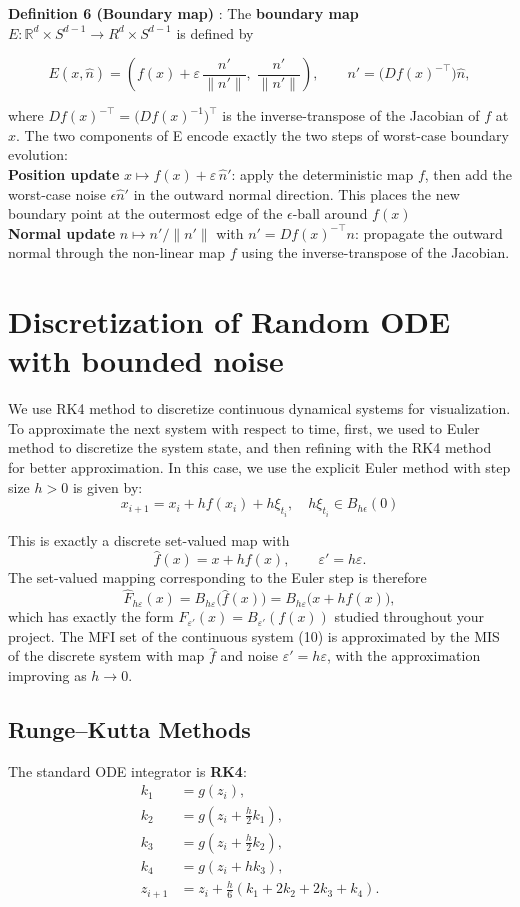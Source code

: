 \documentclass[11pt]{article}
\begin{document}
\textbf{Definition 6 (Boundary map)} \cite{tey2023}: The \textbf{boundary map} $E: \mathbb{R}^d \times S^{d-1} \to {R}^d \times S^{d-1}$ is defined by

\[
E(x,\hat{n})=\left(f(x)+\varepsilon\,\frac{n'}{\|n'\|},\;\frac{n'}{\|n'\|}\right),
\qquad
n'=\bigl(Df(x)^{-\top}\bigr)\hat{n}, \tag{6}
\]

where $Df(x)^{-\top} = \bigl(Df(x)^{-1}\bigr)^\top$ is the inverse-transpose of the Jacobian of \(f\) at \(x\).
The two components of E encode exactly the two steps of worst-case boundary evolution: \\
\textbf{Position update} \(x \mapsto f(x) + \varepsilon\,\hat{n}'\): apply the deterministic map $f$, then add the worst-case noise $\epsilon\hat{n}'$ in the outward normal direction. This places the new boundary point at the outermost edge of the $\epsilon$-ball around $f(x)$\\ 
\textbf{Normal update} \(n \mapsto n'/\|n'\|\) with \(n' = Df(x)^{-\top}n\): propagate the outward normal through the non-linear map $f$ using the inverse-transpose of the Jacobian.
\section{Discretization of Random ODE with bounded noise}
We use RK4 method to discretize continuous dynamical systems for visualization. To approximate the next system with respect to time, first, we used to Euler method to discretize the system state, and then refining with the RK4 method for better approximation. In this case, we use the explicit Euler method with step size $h > 0$ is given by:
\[
    x_{i+1} = x_i + hf(x_i) + h\xi_{t_{i}}, \quad h\xi_{t_{i}} \in B_{h\epsilon}(0)
\]


This is exactly a discrete set-valued map with
\[
\hat{f}(x)=x+h f(x), \qquad \varepsilon' = h\varepsilon. \tag{7}
\]
The set-valued mapping corresponding to the Euler step is therefore
\[
\hat{F}_{h\varepsilon}(x)=B_{h\varepsilon}\!\bigl(\hat{f}(x)\bigr) = B_{h\varepsilon}\!\bigl(x+h f(x)\bigr), \tag{8}
\]
which has exactly the form \(F_{\varepsilon'}(x)=B_{\varepsilon'}(f(x))\) studied throughout your project.  
The MFI set of the continuous system (10) is approximated by the MIS of the discrete system with map \(\hat{f}\) and noise \(\varepsilon' = h\varepsilon\), with the approximation improving as \(h \to 0\).
\subsection{Runge--Kutta Methods}
The standard ODE integrator is \textbf{RK4}:
\[
\begin{aligned}
k_1 &= g(z_i),\\
k_2 &= g\!\left(z_i+\frac{h}{2}k_1\right),\\
k_3 &= g\!\left(z_i+\frac{h}{2}k_2\right),\\
k_4 &= g(z_i+h k_3),\\
z_{i+1} &= z_i+\frac{h}{6}(k_1+2k_2+2k_3+k_4).
\end{aligned} \tag{9}
\]
\end{document}

